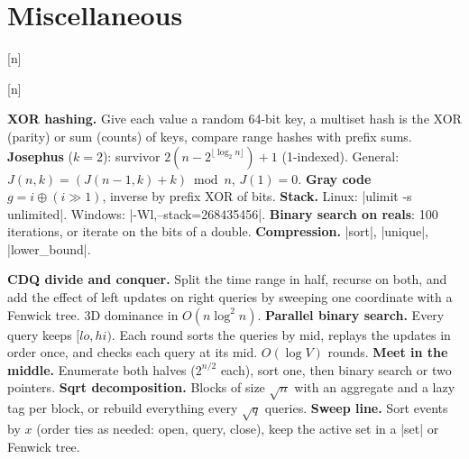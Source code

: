\section{Miscellaneous}

[n]
\cppfile[title=mo,usage={[l, r), blk about n / sqrt(q)},
  funcs={mo,add,del,calc}]{code/misc/mo.cpp}



[\log n]
\cppfile[title=addInterval / removeInterval,usage={disjoint [l, r) in set<pii>},
  funcs={addInterval,removeInterval}]{code/misc/interval-container.cpp}

{\small
\textbf{XOR hashing.} Give each value a random 64-bit key, a multiset hash is the XOR (parity) or sum (counts) of keys, compare range hashes with prefix sums.
\textbf{Josephus} ($k = 2$): survivor $2(n - 2^{\lfloor \log_2 n \rfloor}) + 1$ (1-indexed). General: $J(n, k) = (J(n-1, k) + k) \bmod n$, $J(1) = 0$.
\textbf{Gray code} $g = i \oplus (i \gg 1)$, inverse by prefix XOR of bits.
\textbf{Stack.} Linux: \code|ulimit -s unlimited|. Windows: \code|-Wl,--stack=268435456|.
\textbf{Binary search on reals}: 100 iterations, or iterate on the bits of a double.
\textbf{Compression.} \code|sort|, \code|unique|, \code|lower_bound|.
\par}

{\small
\textbf{CDQ divide and conquer.} Split the time range in half, recurse on both, and add the effect of left updates on right queries by sweeping one coordinate with a Fenwick tree. 3D dominance in $O(n \log^2 n)$.
\textbf{Parallel binary search.} Every query keeps $[lo, hi)$. Each round sorts the queries by mid, replays the updates in order once, and checks each query at its mid. $O(\log V)$ rounds.
\textbf{Meet in the middle.} Enumerate both halves ($2^{n/2}$ each), sort one, then binary search or two pointers.
\textbf{Sqrt decomposition.} Blocks of size $\sqrt n$ with an aggregate and a lazy tag per block, or rebuild everything every $\sqrt q$ queries.
\textbf{Sweep line.} Sort events by $x$ (order ties as needed: open, query, close), keep the active set in a \code|set| or Fenwick tree.
\par}
